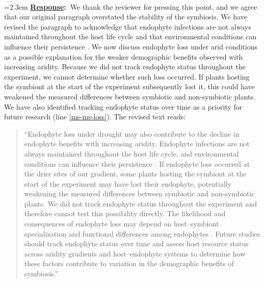 \documentclass[12pt]{article}
\newcommand{\response}[1]{
	\\[0.25em]
	\hangindent=2.3em \textbf{\textcolor{NavyBlue}{\uline{Response}:~}}#1
	}
\providecommand{\uline}[1]{\underline{#1}}
\begin{document}
\response{We thank the reviewer for pressing this point, and we agree that our original paragraph overstated the stability of the symbiosis. We have revised the paragraph to acknowledge that endophyte infections are not always maintained throughout the host life cycle and that environmental conditions can influence their persistence \citep{afkhami2008symbiosis,david2019testing}. We now discuss endophyte loss under arid conditions as a possible explanation for the weaker demographic benefits observed with increasing aridity. Because we did not track endophyte status throughout the experiment, we cannot determine whether such loss occurred. If plants hosting the symbiont at the start of the experiment subsequently lost it, this could have weakened the measured differences between symbiotic and non-symbiotic plants. We have also identified tracking endophyte status over time as a priority for future research (line \ref{ms-ms-loss}). The revised text reads:

\begin{quote}
``Endophyte loss under drought may also contribute to the decline in endophyte benefits with increasing aridity. Endophyte infections are not always maintained throughout the host life cycle, and environmental conditions can influence their persistence \citep{afkhami2008symbiosis,david2019testing}. If endophyte loss occurred at the drier sites of our gradient, some plants hosting the symbiont at the start of the experiment may have lost their endophyte, potentially weakening the measured differences between symbiotic and non-symbiotic plants. We did not track endophyte status throughout the experiment and therefore cannot test this possibility directly. The likelihood and consequences of endophyte loss may depend on host--symbiont specialization and functional differences among endophytes \citep{saona2010environmental}. Future studies should track endophyte status over time and assess host resource status across aridity gradients and host--endophyte systems to determine how these factors contribute to variation in the demographic benefits of symbiosis.''
\end{quote}
}
\newpage


\end{document}
